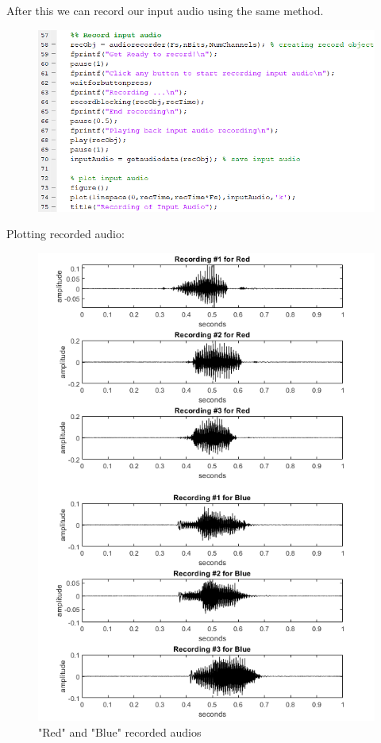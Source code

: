 \documentclass{article}
\begin{document}
After this we can record our input audio using the same method.

\begin{figure}[H]
    \centering
    \includegraphics[width=\linewidth]{MATLAB_inputaudio.png}
    \caption{}
    \label{fig:MATLAB_inputAudio}
\end{figure}

Plotting recorded audio:
\begin{figure}[H]
    \centering
    \includegraphics[width=\linewidth]{REC_RB.png}
    \caption{"Red" and "Blue" recorded audios}
    \label{fig:MATLAB_REDandBLUE}
\end{figure}
\end{document}
